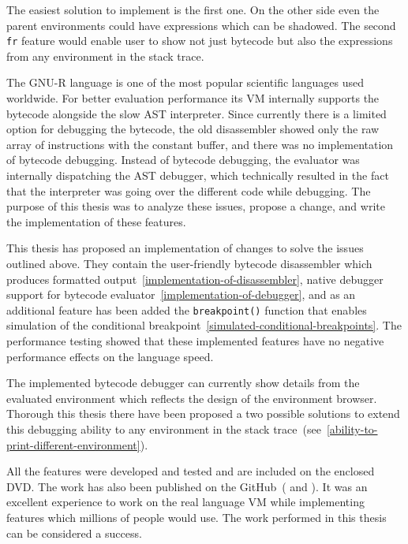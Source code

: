 \documentclass[thesis=M,english]{FITthesis}[2018/10/20]
\newcommand{\code}[1]{\texttt{#1}}
\begin{document}
{The easiest solution to implement is the first one. On the other side even the parent environments could have expressions which can be shadowed. The second \code{fr} feature would enable user to show not just bytecode but also the expressions from any environment in the stack trace.

\begin{conclusion}\label{conclusion}

The GNU-R language is one of the most popular scientific languages used worldwide. For better evaluation performance its VM internally supports the bytecode alongside the slow AST interpreter. Since currently there is a limited option for debugging the bytecode, the old disassembler showed only the raw array of instructions with the constant buffer, and there was no implementation of bytecode debugging. Instead of bytecode debugging, the evaluator was internally dispatching the AST debugger, which technically resulted in the fact that the interpreter was going over the different code while debugging. The purpose of this thesis was to analyze these issues, propose a change, and write the implementation of these features.

This thesis has proposed an implementation of changes to solve the issues outlined above. They contain the user-friendly bytecode disassembler which produces formatted output~\ref{implementation-of-disassembler}, native debugger support for bytecode evaluator~\ref{implementation-of-debugger}, and as an additional feature has been added the \code{breakpoint()} function that enables simulation of the conditional breakpoint~\ref{simulated-conditional-breakpoints}. The performance testing showed that these implemented features have no negative performance effects on the language speed.

The implemented bytecode debugger can currently show details from the evaluated environment which reflects the design of the environment browser. Thorough this thesis there have been proposed a two possible solutions to extend this debugging ability to any environment in the stack trace~(see~\ref{ability-to-print-different-environment}).

All the features were developed and tested and are included on the enclosed DVD. The work has also been published on the GitHub~(\cite{R_WITH_BC_DEBUGGER} and \cite{R_BC_DISASSEMBLER}). It was an excellent experience to work on the real language VM while implementing features which millions of people would use. The work performed in this thesis can be considered a success.


\end{conclusion}}
\end{document}

